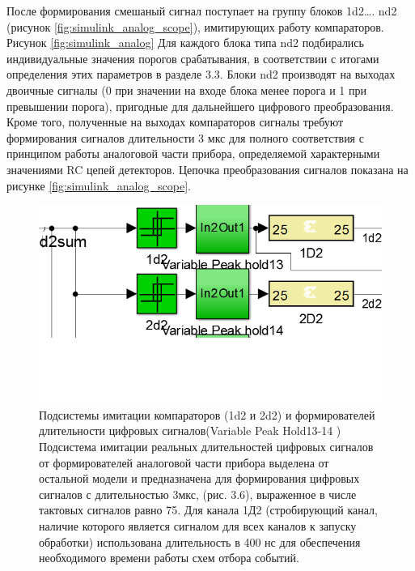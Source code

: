 После формирования смешаный сигнал поступает на группу блоков 1d2…. nd2 (рисунок \ref{fig:simulink_analog_scope}), имитирующих работу компараторов. 
Рисунок \ref{fig:simulink_analog} Для каждого блока типа  nd2 подбирались индивидуальные значения порогов срабатывания, в соответствии с итогами определения этих параметров в разделе 3.3. Блоки nd2 производят на выходах двоичные сигналы (0 при значении на входе блока менее порога и 1 при превышении порога), пригодные для дальнейшего цифрового преобразования. Кроме того, полученные на выходах компараторов сигналы требуют формирования сигналов длительности 3 мкс для полного соответствия с принципом работы аналоговой части прибора, определяемой характерными значениями RC цепей детекторов. Цепочка преобразования сигналов показана на рисунке \ref{fig:simulink_analog_scope}.

\begin{figure}
\centering
\includegraphics[width=0.7\linewidth]{images/sim_comparators}
\caption{Подсистемы имитации компараторов (1d2 и 2d2) и формирователей длительности цифровых сигналов(Variable Peak Hold13-14 )
	Подсистема имитации реальных длительностей цифровых сигналов от формирователей аналоговой части прибора выделена от остальной модели и предназначена для формирования цифровых сигналов с длительностью 3мкс, (рис. 3.6), выраженное в числе тактовых сигналов равно 75. Для канала 1Д2 (стробирующий канал, наличие которого является сигналом для всех каналов к запуску обработки) использована длительность в 400 нс для обеспечения необходимого времени работы схем отбора событий.}
\label{fig:sim_comparators}
\end{figure}


